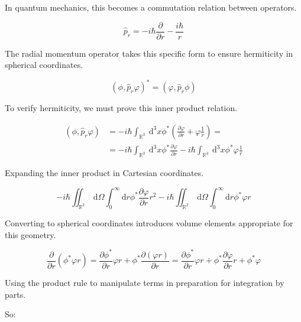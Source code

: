 \documentclass[italian]{HKNdocument}
\begin{document}
In quantum mechanics, this becomes a commutation relation between operators.

\begin{equation}
\hat{p}_{r}=-i \hbar \frac{\partial}{\partial r}-\frac{i \hbar}{r} \label{eq:9.16}
\end{equation}

The radial momentum operator takes this specific form to ensure hermiticity in spherical coordinates.

\begin{equation}
\left(\phi, \hat{p}_{r} \varphi\right)^{*}=\left(\varphi, \hat{p}_{r} \phi\right) \label{eq:9.17}
\end{equation}

To verify hermiticity, we must prove this inner product relation.

\begin{align}
\left(\phi, \hat{p}_{r} \varphi\right) & =-i \hbar \int_{\mathbb{R}^{3}} \mathrm{~d}^{3} x \phi^{*}\left(\frac{\partial \varphi}{\partial r}+\varphi \frac{1}{r}\right)=  \label{eq:9.18}\\
& =-i \hbar \int_{\mathbb{R}^{3}} \mathrm{~d}^{3} x \phi^{*} \frac{\partial \varphi}{\partial r}-i \hbar \int_{\mathbb{R}^{3}} \mathrm{~d}^{3} x \phi^{*} \varphi \frac{1}{r}
\end{align}

Expanding the inner product in Cartesian coordinates.

\begin{equation}
-i \hbar \iint_{\mathbb{R}^{2}} \mathrm{~d} \Omega \int_{0}^{\infty} \mathrm{d} r \phi^{*} \frac{\partial \varphi}{\partial r} r^{2}-i \hbar \iint_{\mathbb{R}^{2}} \mathrm{~d} \Omega \int_{0}^{\infty} \mathrm{d} r \phi^{*} \varphi r \label{eq:9.19}
\end{equation}

Converting to spherical coordinates introduces volume elements appropriate for this geometry.

\begin{equation}
\frac{\partial}{\partial r}\left(\phi^{*} \varphi r\right)=\frac{\partial \phi^{*}}{\partial r} \varphi r+\phi^{*} \frac{\partial(\varphi r)}{\partial r}=\frac{\partial \phi^{*}}{\partial r} \varphi r+\phi^{*} \frac{\partial \varphi}{\partial r} r+\phi^{*} \varphi \label{eq:9.20}
\end{equation}

Using the product rule to manipulate terms in preparation for integration by parts.

So:
\end{document}
